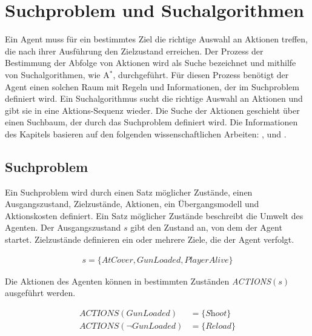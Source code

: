 
\chapter{Suchproblem und Suchalgorithmen}
\label{chap:suchproblem und suchalgorithmen}

Ein Agent muss für ein bestimmtes Ziel die richtige Auswahl an Aktionen treffen, die nach ihrer Ausführung den Zielzustand erreichen. Der Prozess der Bestimmung der Abfolge von Aktionen wird als Suche bezeichnet und mithilfe von Suchalgorithmen, wie A$^*$, durchgeführt. Für diesen Prozess benötigt der Agent einen solchen Raum mit Regeln und Informationen, der im Suchproblem definiert wird. Ein Suchalgorithmus sucht die richtige Auswahl an Aktionen und gibt sie in eine Aktions-Sequenz wieder. Die Suche der Aktionen geschieht über einen Suchbaum, der durch das Suchproblem definiert wird. Die Informationen des Kapitels basieren auf den folgenden wissenschaftlichen Arbeiten: \autocite{RN2020}, \autocite{4082128} und \autocite{Felner2011}.

\section{Suchproblem}
\label{chap:suchproblem}

Ein Suchproblem wird durch einen Satz möglicher Zustände, einen Ausgangszustand, Zielzustände, Aktionen, ein Übergangsmodell und Aktionskosten definiert. Ein Satz möglicher Zustände beschreibt die Umwelt des Agenten. Der Ausgangszustand $s$ gibt den Zustand an, von dem der Agent startet. Zielzustände definieren ein oder mehrere Ziele, die der Agent verfolgt.


\begin{align}
	s = \{\textit{AtCover}, \textit{GunLoaded}, \textit{PlayerAlive}\}
\end{align}


Die Aktionen des Agenten können in bestimmten Zuständen \textit{ACTIONS}$(s)$ ausgeführt werden.

\begin{align}
	\textit{ACTIONS}(\textit{GunLoaded}) &= \{\textit{Shoot}\} \\
	\textit{ACTIONS}(\lnot \textit{GunLoaded}) &= \{\textit{Reload}\}
\end{align}

